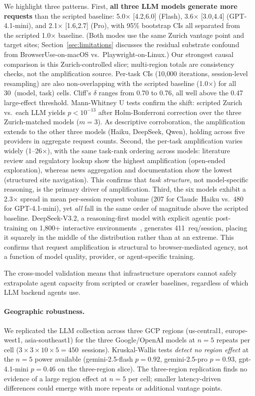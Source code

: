 \documentclass[10pt,sigconf,letterpaper,anonymous,nonacm]{acmart}
\begin{document}
We highlight three patterns.  First, \textbf{all three LLM models generate
more requests} than the scripted baseline: 5.0$\times$
[4.2,6.0] (Flash), 3.6$\times$ [3.0,4.4] (GPT-4.1-mini), and
2.1$\times$ [1.6,2.7] (Pro), with 95\% bootstrap CIs all separated from the scripted 1.0$\times$ baseline.
(Both modes use the same Zurich vantage point and target sites;
Section~\ref{sec:limitations} discusses the residual substrate
confound from BrowserUse-on-macOS vs.\ Playwright-on-Linux.)
Our strongest causal comparison is this Zurich-controlled slice;
multi-region totals are consistency checks, not the amplification source.
Per-task CIs (10{,}000 iterations, session-level resampling) are also
non-overlapping with the scripted baseline (1.0$\times$) for all
30~(model, task) cells.  Cliff's $\delta$ ranges from 0.70 to 0.76,
all well above the 0.47 large-effect threshold.
Mann-Whitney U tests confirm the shift: scripted Zurich vs.\ each LLM
yields $p < 10^{-13}$ after Holm-Bonferroni correction over the
three Zurich-matched models ($m=3$).  As descriptive corroboration,
the amplification extends to the other three models (Haiku, DeepSeek,
Qwen), holding across five providers in aggregate request counts.
Second, the per-task amplification varies widely (1--26$\times$), with
the same task-rank ordering across models: literature review and
regulatory lookup show the highest amplification (open-ended
exploration), whereas news aggregation and documentation show the lowest
(structured site navigation).  This confirms that \emph{task structure},
not model-specific reasoning, is the primary driver of amplification.
Third, the six models exhibit a 2.3$\times$ spread in mean per-session
request volume (207 for Claude~Haiku vs.\ 480 for GPT-4.1-mini),
yet \emph{all} fall
in the same order of magnitude above the scripted baseline.
DeepSeek-V3.2, a reasoning-first model with explicit agentic
post-training on 1{,}800+ interactive
environments~\cite{deepseek2026v32}, generates 411~req/session,
placing it squarely in the middle of the distribution rather than at
an extreme.  This confirms that request amplification is structural to
browser-mediated agency, not a function of model quality, provider, or
agent-specific training.

The cross-model validation means that infrastructure operators cannot
safely extrapolate agent capacity from scripted or crawler baselines,
regardless of which LLM backend agents use.

\paragraph{Geographic robustness.}
We replicated the LLM collection across three GCP regions
(us-central1, europe-west1, asia-southeast1) for the three
Google/OpenAI models at $n{=}5$ repeats per cell ($3 \times 3 \times
10 \times 5 = 450$~sessions).  Kruskal-Wallis tests \emph{detect no region effect} at the
$n{=}5$ power available (gemini-2.5-flash $p=0.92$,
gemini-2.5-pro $p=0.93$, gpt-4.1-mini $p=0.46$ on the three-region
slice).  The three-region replication finds no evidence of a large region
effect at $n{=}5$ per cell; smaller latency-driven differences could emerge
with more repeats or additional vantage points.
\end{document}
